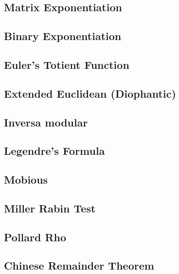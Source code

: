 \subsection{Matrix Exponentiation}
\raggedbottom
\hrulefill
\subsection{Binary Exponentiation}
\raggedbottom
\hrulefill
\subsection{Euler's Totient Function}
\raggedbottom
\hrulefill
\subsection{Extended Euclidean (Diophantic)}
\raggedbottom
\hrulefill
\subsection{Inversa modular}
\raggedbottom
\hrulefill
\subsection{Legendre's Formula}
\raggedbottom
\hrulefill
\subsection{Mobious}
\raggedbottom
\hrulefill
\subsection{Miller Rabin Test}
\raggedbottom
\hrulefill
\subsection{Pollard Rho}
\raggedbottom
\hrulefill
\subsection{Chinese Remainder Theorem}
\raggedbottom
\hrulefill
